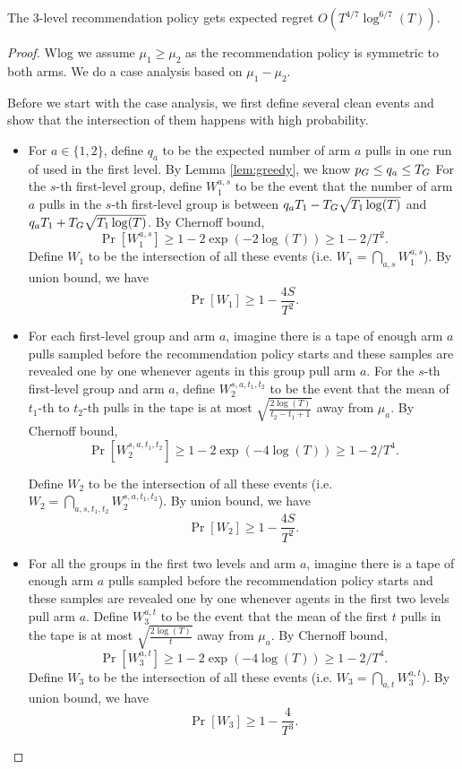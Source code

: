 \begin{theorem}
\label{thm:3level}
The 3-level recommendation policy gets expected regret $O(T^{4/7} \log^{6/7}(T))$. 
\end{theorem}

\begin{proof}
Wlog we assume $\mu_1 \geq \mu_2$ as the recommendation policy is symmetric to both arms. We do a case analysis based on $\mu_1-\mu_2$. 

Before we start with the case analysis, we first define several clean events and show that the intersection of them happens with high probability. 
\begin{itemize}
\item For $a \in \{1,2\}$, define $q_a$ to be the expected number of arm $a$ pulls in one run of \ALGG used in the first level. By Lemma \ref{lem:greedy}, we know $p_G \leq q_a \leq T_G$ For the $s$-th first-level group, define $W_1^{a,s}$ to be the event that the number of arm $a$ pulls in the $s$-th first-level group is between $q_a T_1- T_G \sqrt{T_1\log(T)}$ and $q_a T_1 + T_G \sqrt{T_1\log(T)}$. By Chernoff bound,
\[
\Pr[W_1^{a,s}] \geq 1-2\exp(-2\log(T)) \geq 1-2/T^2.
\]
Define $W_1$ to be the intersection of all these events (i.e. $W_1 = \bigcap_{a,s}W_1^{a,s}$). By union bound, we have
\[
\Pr[W_1] \geq 1- \frac{4S}{T^2}.
\]
\item For each first-level group and arm $a$, imagine there is a tape of enough arm $a$ pulls sampled before the recommendation policy starts and these samples are revealed one by one whenever agents in this group pull arm $a$. For the $s$-th first-level group and arm $a$, define $W_2^{s,a,t_1,t_2}$ to be the event that the mean of $t_1$-th to $t_2$-th pulls in the tape is at most $\sqrt{\frac{2\log(T)}{t_2-t_1+1}}$ away from $\mu_a$. By Chernoff bound, 
\[
\Pr[W_2^{s,a,t_1,t_2}] \geq 1 - 2\exp(-4\log(T)) \geq 1- 2/T^4.
\]

Define $W_2$ to be the intersection of all these events (i.e. $W_2 = \bigcap_{a,s,t_1,t_2} W_2^{s,a,t_1,t_2}$). By union bound, we have
\[
\Pr[W_2] \geq 1- \frac{4S}{T^2}.
\]

\item For all the groups in the first two levels and arm $a$, imagine there is a tape of enough arm $a$ pulls sampled before the recommendation policy starts and these samples are revealed one by one whenever agents in the first two levels pull arm $a$. Define $W_3^{a,t}$ to be the event that the mean of the first $t$ pulls in the tape is at most $\sqrt{\frac{2\log(T)}{t}}$ away from $\mu_a$. By Chernoff bound, 
\[
\Pr[W_3^{a,t}] \geq 1 - 2\exp(-4\log(T)) \geq 1- 2/T^4.
\]
Define $W_3$ to be the intersection of all these events (i.e. $W_3 = \bigcap_{a,t} W_3^{a,t}$). By union bound, we have
\[
\Pr[W_3] \geq 1- \frac{4}{T^3}.
\]


\end{itemize}
\end{proof}

